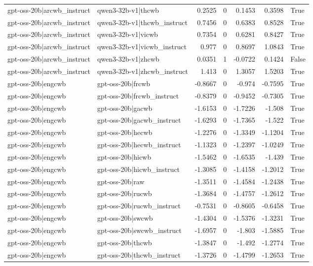 \begin{table}
\begin{tabular}{l l r r r r l}
gpt-oss-20b|arcwb_instruct & qwen3-32b-v1|thcwb & 0.2525 & 0 & 0.1453 & 0.3598 & True \\
gpt-oss-20b|arcwb_instruct & qwen3-32b-v1|thcwb_instruct & 0.7456 & 0 & 0.6383 & 0.8528 & True \\
gpt-oss-20b|arcwb_instruct & qwen3-32b-v1|vicwb & 0.7354 & 0 & 0.6281 & 0.8427 & True \\
gpt-oss-20b|arcwb_instruct & qwen3-32b-v1|vicwb_instruct & 0.977 & 0 & 0.8697 & 1.0843 & True \\
gpt-oss-20b|arcwb_instruct & qwen3-32b-v1|zhcwb & 0.0351 & 1 & -0.0722 & 0.1424 & False \\
gpt-oss-20b|arcwb_instruct & qwen3-32b-v1|zhcwb_instruct & 1.413 & 0 & 1.3057 & 1.5203 & True \\
gpt-oss-20b|engcwb & gpt-oss-20b|frcwb & -0.8667 & 0 & -0.974 & -0.7595 & True \\
gpt-oss-20b|engcwb & gpt-oss-20b|frcwb_instruct & -0.8379 & 0 & -0.9452 & -0.7305 & True \\
gpt-oss-20b|engcwb & gpt-oss-20b|gacwb & -1.6153 & 0 & -1.7226 & -1.508 & True \\
gpt-oss-20b|engcwb & gpt-oss-20b|gacwb_instruct & -1.6293 & 0 & -1.7365 & -1.522 & True \\
gpt-oss-20b|engcwb & gpt-oss-20b|hecwb & -1.2276 & 0 & -1.3349 & -1.1204 & True \\
gpt-oss-20b|engcwb & gpt-oss-20b|hecwb_instruct & -1.1323 & 0 & -1.2397 & -1.0249 & True \\
gpt-oss-20b|engcwb & gpt-oss-20b|hicwb & -1.5462 & 0 & -1.6535 & -1.439 & True \\
gpt-oss-20b|engcwb & gpt-oss-20b|hicwb_instruct & -1.3085 & 0 & -1.4158 & -1.2012 & True \\
gpt-oss-20b|engcwb & gpt-oss-20b|raw & -1.3511 & 0 & -1.4584 & -1.2438 & True \\
gpt-oss-20b|engcwb & gpt-oss-20b|rucwb & -1.3684 & 0 & -1.4757 & -1.2612 & True \\
gpt-oss-20b|engcwb & gpt-oss-20b|rucwb_instruct & -0.7531 & 0 & -0.8605 & -0.6458 & True \\
gpt-oss-20b|engcwb & gpt-oss-20b|swcwb & -1.4304 & 0 & -1.5376 & -1.3231 & True \\
gpt-oss-20b|engcwb & gpt-oss-20b|swcwb_instruct & -1.6957 & 0 & -1.803 & -1.5885 & True \\
gpt-oss-20b|engcwb & gpt-oss-20b|thcwb & -1.3847 & 0 & -1.492 & -1.2774 & True \\
gpt-oss-20b|engcwb & gpt-oss-20b|thcwb_instruct & -1.3726 & 0 & -1.4799 & -1.2653 & True \\

\end{tabular}
\end{table}
